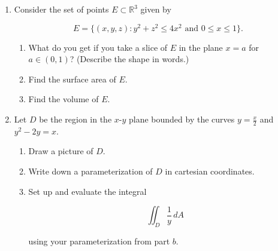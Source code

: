\documentclass[12 pt]{report}
\begin{document}
\newpage
\begin{enumerate}

\item Consider the set of points $E \subset \mathbb{R}^3$ given by 

\[
E = \{(x,y,z): y^2 + z^2 \leq 4x^2 \text{ and } 0 \leq x \leq 1\}.
\]

\begin{enumerate} \item What do you get if you take a slice of $E$ in the plane $x = a$ for $a \in (0,1)$? (Describe the shape in words.)
\vspace{3cm} 

\item Find the surface area of $E$.

\vfill

\newpage

\item Find the volume of $E$.

\vfill
\end{enumerate}


\newpage

\item Let $D$ be the region in the $x$-$y$ plane bounded by the curves $y = \frac{x}{2}$ and $y^2 - 2y = x$. 

\begin{enumerate} \item Draw a picture of $D$. 

\vspace{4cm}  

\item Write down a parameterization of $D$ in cartesian coordinates. 

\vspace{3cm}

\item Set up and evaluate the integral 

\[
\iint_D \frac{1}{y} \, dA
\]

using your parameterization from part $b$. 

\end{enumerate}

\vfill





%
%
%
%
%
%
%
%
%
%
%
%


\end{enumerate}
\end{document}

